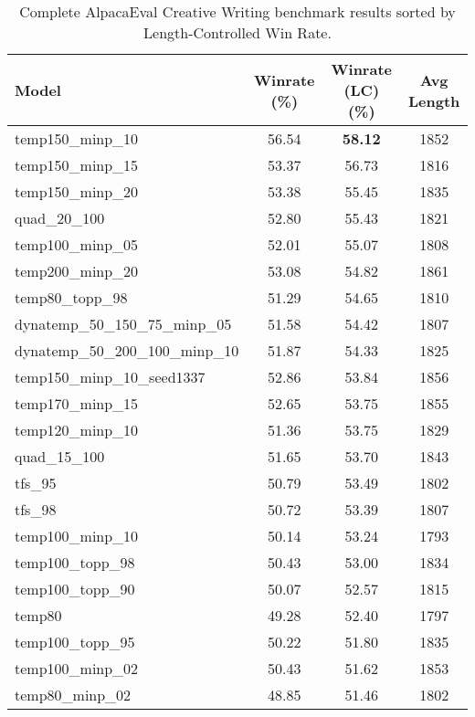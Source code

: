\documentclass{article}
\begin{document}
\begin{table}[t!]
    \caption{Complete AlpacaEval Creative Writing benchmark results sorted by Length-Controlled Win Rate.}
    \centering
    \begin{tabular}{lccc}
        \hline
        \textbf{Model} & \textbf{Winrate (\%)} & \textbf{Winrate (LC) (\%)} & \textbf{Avg Length} \\
        \hline
        \rowcolor{gray!10} temp150\_minp\_10 & 56.54 & \textbf{58.12} & 1852 \\
        temp150\_minp\_15 & 53.37 & 56.73 & 1816 \\
        \rowcolor{gray!10} temp150\_minp\_20 & 53.38 & 55.45 & 1835 \\
        quad\_20\_100 & 52.80 & 55.43 & 1821 \\
        \rowcolor{gray!10} temp100\_minp\_05 & 52.01 & 55.07 & 1808 \\
        temp200\_minp\_20 & 53.08 & 54.82 & 1861 \\
        \rowcolor{gray!10} temp80\_topp\_98 & 51.29 & 54.65 & 1810 \\
        dynatemp\_50\_150\_75\_minp\_05 & 51.58 & 54.42 & 1807 \\
        \rowcolor{gray!10} dynatemp\_50\_200\_100\_minp\_10 & 51.87 & 54.33 & 1825 \\
        temp150\_minp\_10\_seed1337 & 52.86 & 53.84 & 1856 \\
        \rowcolor{gray!10} temp170\_minp\_15 & 52.65 & 53.75 & 1855 \\
        temp120\_minp\_10 & 51.36 & 53.75 & 1829 \\
        \rowcolor{gray!10} quad\_15\_100 & 51.65 & 53.70 & 1843 \\
        tfs\_95 & 50.79 & 53.49 & 1802 \\
        \rowcolor{gray!10} tfs\_98 & 50.72 & 53.39 & 1807 \\
        temp100\_minp\_10 & 50.14 & 53.24 & 1793 \\
        \rowcolor{gray!10} temp100\_topp\_98 & 50.43 & 53.00 & 1834 \\
        temp100\_topp\_90 & 50.07 & 52.57 & 1815 \\
        \rowcolor{gray!10} temp80 & 49.28 & 52.40 & 1797 \\
        temp100\_topp\_95 & 50.22 & 51.80 & 1835 \\
        \rowcolor{gray!10} temp100\_minp\_02 & 50.43 & 51.62 & 1853 \\
        temp80\_minp\_02 & 48.85 & 51.46 & 1802 \\

\end{tabular}
\end{table}
\end{document}
